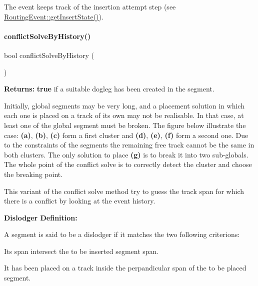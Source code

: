 The event keeps track of the insertion attempt step (see \mbox{\hyperlink{classKite_1_1RoutingEvent_a00f02910915e7deb857f023e5d584c08}{Routing\+Event\+::get\+Insert\+State()}}). \mbox{\label{classKite_1_1SegmentFsm_a0d9a9926ae67cc7998799347f135e28a}} 
\paragraph{\texorpdfstring{conflict\+Solve\+By\+History()}{conflictSolveByHistory()}}
{\footnotesize\ttfamily bool conflict\+Solve\+By\+History (\begin{DoxyParamCaption}{ }\end{DoxyParamCaption})}

{\bfseries Returns\+:} {\bfseries true} if a suitable dogleg has been created in the segment.

Initially, global segments may be very long, and a placement solution in which each one is placed on a track of it\textquotesingle{}s own may not be realisable. In that case, at least one of the global segment must be broken. The figure below illustrate the case\+: {\bfseries (a)}, {\bfseries (b)}, {\bfseries (c)} form a first cluster and {\bfseries (d)}, {\bfseries (e)}, {\bfseries (f)} form a second one. Due to the constraints of the segments the remaining free track cannot be the same in both clusters. The only solution to place {\bfseries (g)} is to break it into two sub-\/globals. The whole point of the conflict solve is to correctly detect the cluster and choose the breaking point.

 This variant of the conflict solve method try to guess the track span for which there is a conflict by looking at the event history.

 {\bfseries Dislodger Definition\+:}

A segment is said to be a dislodger if it matches the two following criterions\+:
\begin{DoxyItemize}
\item It\textquotesingle{}s span intersect the to be inserted segment span.
\item It has been placed on a track inside the perpandicular span of the to be placed segment.
\end{DoxyItemize}

